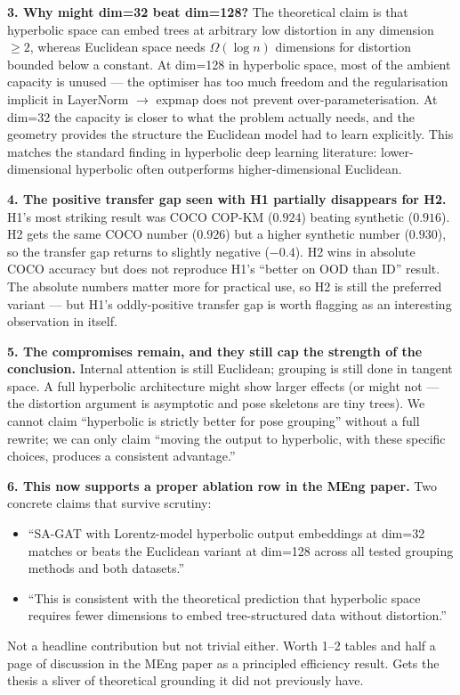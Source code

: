 \textbf{3. Why might dim=32 beat dim=128?} The theoretical claim is that hyperbolic space can embed trees at arbitrary low distortion in any dimension $\geq 2$, whereas Euclidean space needs $\Omega(\log n)$ dimensions for distortion bounded below a constant. At dim=128 in hyperbolic space, most of the ambient capacity is unused --- the optimiser has too much freedom and the regularisation implicit in LayerNorm $\to$ expmap does not prevent over-parameterisation. At dim=32 the capacity is closer to what the problem actually needs, and the geometry provides the structure the Euclidean model had to learn explicitly. This matches the standard finding in hyperbolic deep learning literature: lower-dimensional hyperbolic often outperforms higher-dimensional Euclidean.

\textbf{4. The positive transfer gap seen with H1 partially disappears for H2.} H1's most striking result was COCO COP-KM ($0.924$) beating synthetic ($0.916$). H2 gets the same COCO number ($0.926$) but a higher synthetic number ($0.930$), so the transfer gap returns to slightly negative ($-0.4$). H2 wins in absolute COCO accuracy but does not reproduce H1's ``better on OOD than ID'' result. The absolute numbers matter more for practical use, so H2 is still the preferred variant --- but H1's oddly-positive transfer gap is worth flagging as an interesting observation in itself.

\textbf{5. The compromises remain, and they still cap the strength of the conclusion.} Internal attention is still Euclidean; grouping is still done in tangent space. A full hyperbolic architecture might show larger effects (or might not --- the distortion argument is asymptotic and pose skeletons are tiny trees). We cannot claim ``hyperbolic is strictly better for pose grouping'' without a full rewrite; we can only claim ``moving the output to hyperbolic, with these specific choices, produces a consistent advantage.''

\textbf{6. This now supports a proper ablation row in the MEng paper.} Two concrete claims that survive scrutiny:
\begin{itemize}
    \item ``SA-GAT with Lorentz-model hyperbolic output embeddings at dim=32 matches or beats the Euclidean variant at dim=128 across all tested grouping methods and both datasets.''
    \item ``This is consistent with the theoretical prediction that hyperbolic space requires fewer dimensions to embed tree-structured data without distortion.''
\end{itemize}
Not a headline contribution but not trivial either. Worth 1--2 tables and half a page of discussion in the MEng paper as a principled efficiency result. Gets the thesis a sliver of theoretical grounding it did not previously have.


